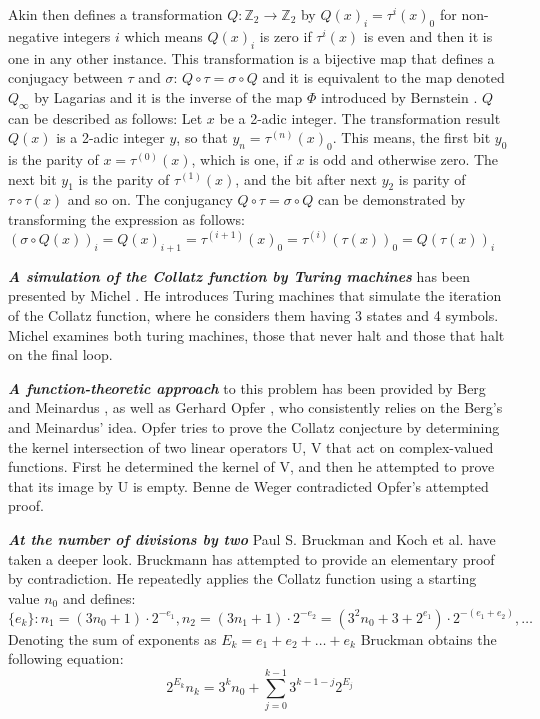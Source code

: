 Akin then defines a transformation $Q:\mathbb{Z}_2\rightarrow\mathbb{Z}_2$ by $Q(x)_i=\tau^i(x)_0$ for non-negative integers $i$ which means $Q(x)_i$ is zero if $\tau^i(x)$ is even and then it is one in any other instance. This transformation is a bijective map that defines a conjugacy between $\tau$ and $\sigma$: $Q\circ\tau=\sigma\circ Q$ and it is equivalent to the map denoted $Q_\infty$ by Lagarias \cite{Ref_Lagarias_1985} and it is the inverse of the map $\Phi$ introduced by Bernstein \cite{Ref_Bernstein_Lagarias_1996}. $Q$ can be described as follows: Let $x$ be a 2-adic integer. The transformation result $Q(x)$ is a 2-adic integer $y$, so that $y_n=\tau^{(n)}(x)_0$. This means, the first bit $y_0$ is the parity of $x=\tau^{(0)}(x)$, which is one, if $x$ is odd and otherwise zero. The next bit $y_1$ is the parity of $\tau^{(1)}(x)$, and the bit after next $y_2$ is parity of $\tau\circ\tau(x)$ and so on. The conjugancy $Q\circ\tau=\sigma\circ Q$ can be demonstrated by transforming the expression as follows: $(\sigma\circ Q(x))_i=Q(x)_{i+1}=\tau^{(i+1)}(x)_0=\tau^{(i)}(\tau(x))_0=Q(\tau(x))_i$

\par\medskip
\textit{\textbf{A simulation of the Collatz function by Turing machines}} has been presented by Michel \cite{Ref_Michel_2014}. He introduces Turing machines that simulate the iteration of the Collatz function, where he considers them having 3 states and 4 symbols. Michel examines both turing machines, those that never halt and those that halt on the final loop.

\par\medskip
\textit{\textbf{A function-theoretic approach}} to this problem has been provided by Berg and Meinardus \cite{Ref_Berg_Meinardus_1994}, \cite{Ref_Berg_Meinardus_1995} as well as Gerhard Opfer \cite{Ref_Opfer_2011}, who consistently relies on the Berg’s and Meinardus’ idea. Opfer tries to prove the Collatz conjecture by determining the kernel intersection of two linear operators U, V that act on complex-valued functions. First he determined the kernel of V, and then he attempted to prove that its image by U is empty. Benne de Weger \cite{Ref_de_Weger_2011} contradicted Opfer’s attempted proof.

\par\medskip
\textit{\textbf{At the number of divisions by two}} Paul S. Bruckman \cite{Ref_Bruckman_2008} and Koch et al. \cite{Ref_Koch_2020} have taken a deeper look. Bruckmann has attempted to provide an elementary proof by contradiction. He repeatedly applies the Collatz function using a starting value $n_0$ and defines:
\[
\{e_k\}:n_1=(3n_0+1)\cdot2^{-e_1},n_2=(3n_1+1)\cdot2^{-e_2}=(3^2n_0+3+2^{e_1})\cdot2^{-(e_1+e_2)},\ldots
\]
Denoting the sum of exponents as $E_k=e_1+e_2+\ldots+e_k$ Bruckman obtains the following equation:
\[
2^{E_k}n_k=3^kn_0+\sum_{j=0}^{k-1}3^{k-1-j}2^{E_j}
\]

